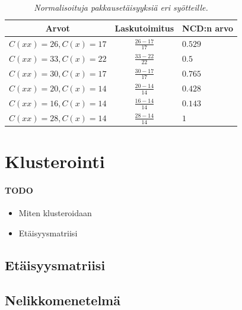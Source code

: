 \documentclass[12pt,finnish]{tktltiki2}
\theoremstyle{definition}
\theoremstyle{remark}
\begin{document}
  \begin{table}[t]
    \begin{tabular}{c|c|l}
      Arvot                    & Laskutoimitus      & NCD:n arvo \\ \hline
      $ C(xx) = 26, C(x) = 17$ & $\frac{26-17}{17} $ & $0.529$    \\ \hline
      $ C(xx) = 33, C(x) = 22$ & $\frac{33-22}{22} $ & $0.5$      \\ \hline
      $ C(xx) = 30, C(x) = 17$ & $\frac{30-17}{17} $ & $0.765$    \\ \hline
      $ C(xx) = 20, C(x) = 14$ & $\frac{20-14}{14} $ & $0.428$    \\ \hline
      $ C(xx) = 16, C(x) = 14$ & $\frac{16-14}{14} $ & $0.143$    \\ \hline
      $ C(xx) = 28, C(x) = 14$ & $\frac{28-14}{14} $ & $1$        \\
    \end{tabular}
    \caption{\emph{Normalisoituja pakkausetäisyyksiä eri syötteille.}}
    \label{tab:NCD-values}
  \end{table}


\section{Klusterointi} %
  \label{sec:klusterointi}
    \paragraph{TODO} %
    \begin{itemize}
      \item Miten klusteroidaan
      \item Etäisyysmatriisi
    \end{itemize}
    \subsection{Etäisyysmatriisi} %
    \label{sub:etaisyysmatriisi}

    \subsection{Nelikkomenetelmä} %
    \label{sub:nelikkomenetelma}

\end{document}
